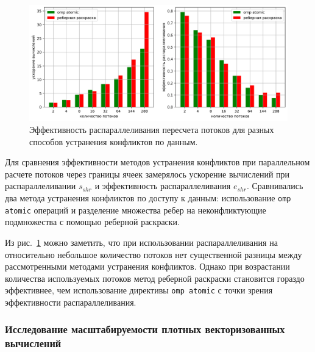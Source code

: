 \begin{figure}[ht]
\centering
\includegraphics[width=1.0\textwidth]{fig/par_edge_col_11-chart.png}
\singlespacing
{}\caption{Эффективность распараллеливания пересчета потоков для разных способов устранения конфликтов по данным.}
\label{fig:text_3_edge_coloring_11}
\end{figure}

Для сравнения эффективности методов устранения конфликтов при параллельном расчете потоков через границы ячеек замерялось ускорение вычислений при распараллеливании $s_{shr}$ и эффективность распараллеливания $e_{shr}$.
Сравнивались два метода устранения конфликтов по доступу к данным: использование \texttt{omp atomic} операций и разделение множества ребер на неконфликтующие подмножества с помощью реберной раскраски.

Из рис.~\ref{fig:text_3_edge_coloring_11} можно заметить, что при использовании распараллеливания на относительно небольшое количество потоков нет существенной разницы между рассмотренными методами устранения конфликтов.
Однако при возрастании количества используемых потоков метод реберной раскраски становится гораздо эффективнее, чем использование директивы \texttt{omp atomic} с точки зрения эффективности распараллеливания.

\subsubsection{Исследование масштабируемости плотных векторизованных вычислений}

